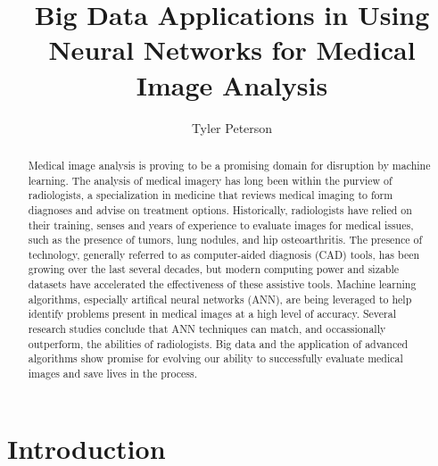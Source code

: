 \documentclass[sigconf]{acmart}
\begin{document}
\title{Big Data Applications in Using Neural Networks for Medical Image Analysis}


\author{Tyler Peterson}


\renewcommand{\shortauthors}{G. v. Laszewski}


\begin{abstract}

 Medical image analysis is proving to be a promising domain for disruption by machine learning. The analysis of medical imagery has long been within the purview of radiologists, a specialization in medicine that reviews medical imaging to form diagnoses and advise on treatment options. Historically, radiologists have relied on their training, senses and years of experience to evaluate images for medical issues, such as the presence of tumors, lung nodules, and hip osteoarthritis. The presence of technology, generally referred to as computer-aided diagnosis (CAD) tools, has been growing over the last several decades, but modern computing power and sizable datasets have accelerated the effectiveness of these assistive tools. Machine learning algorithms, especially artifical neural networks (ANN), are being leveraged to help identify problems present in medical images at a high level of accuracy. Several research studies conclude that ANN techniques can match, and occassionally outperform, the abilities of radiologists. Big data and the application of advanced algorithms show promise for evolving our ability to successfully evaluate medical images and save lives in the process.      
  
\end{abstract}




\maketitle


\section{Introduction}
\end{document}
